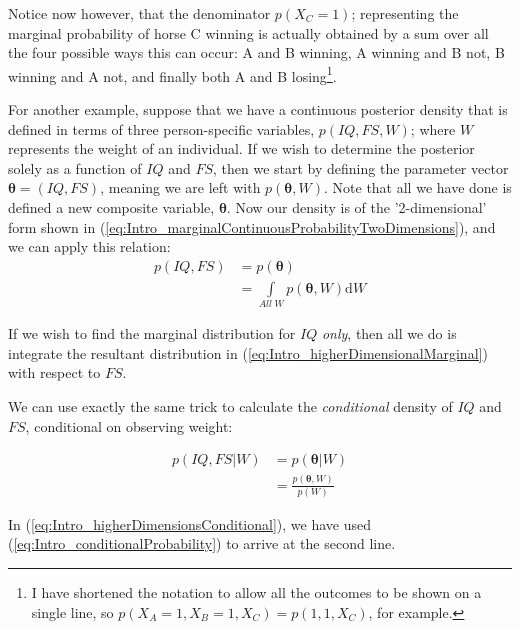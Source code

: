 \documentclass[11pt,fullpage]{book}
\begin{document}
Notice now however, that the denominator $p(X_C=1)$; representing the marginal probability of horse C winning is actually obtained by a sum over all the four possible ways this can occur: A and B winning, A winning and B not, B winning and A not, and finally both A and B losing\footnote{I have shortened the notation to allow all the outcomes to be shown on a single line, so $p(X_A=1,X_B=1,X_C)=p(1,1,X_C)$, for example.}.

For another example, suppose that we have a continuous posterior density that is defined in terms of three person-specific variables, $p(IQ,FS,W)$; where $W$ represents the weight of an individual. If we wish to determine the posterior solely as a function of $IQ$ and $FS$, then we start by defining the parameter vector $\boldsymbol{\theta} = (IQ,FS)$, meaning we are left with $p(\boldsymbol{\theta},W)$. Note that all we have done is defined a new composite variable, $\boldsymbol{\theta}$. Now our density is of the '2-dimensional' form shown in (\ref{eq:Intro_marginalContinuousProbabilityTwoDimensions}), and we can apply this relation:\\

\begin{equation}\label{eq:Intro_higherDimensionalMarginal}
\begin{align}
p(IQ,FS) &= p(\boldsymbol{\theta})\\
&= \int\limits_{All\; W} p(\boldsymbol{\theta},W)\mathrm{d}W
\end{align}
\end{equation}

If we wish to find the marginal distribution for $IQ$ \textit{only}, then all we do is integrate the resultant distribution in (\ref{eq:Intro_higherDimensionalMarginal}) with respect to $FS$.

We can use exactly the same trick to calculate the \textit{conditional} density of $IQ$ and $FS$, conditional on observing weight:

\begin{equation}\label{eq:Intro_higherDimensionsConditional}
\begin{align}
p(IQ,FS|W) &= p(\boldsymbol{\theta}|W)\\
&= \frac{p(\boldsymbol{\theta},W)}{p(W)}
\end{align}
\end{equation}

In (\ref{eq:Intro_higherDimensionsConditional}), we have used (\ref{eq:Intro_conditionalProbability}) to arrive at the second line.
\end{document}
